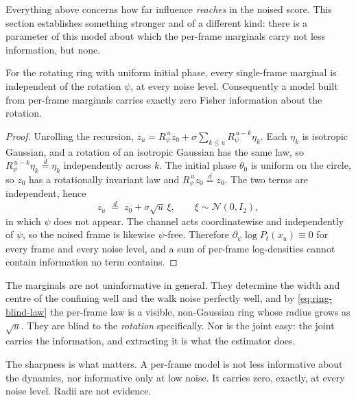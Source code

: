 Everything above concerns how far influence \emph{reaches} in the noised score.
This section establishes something stronger and of a different kind: there is a
parameter of this model about which the per-frame marginals carry not less
information, but none.

\begin{theorem}\label{thm:ring-blindness}
For the rotating ring with uniform initial phase, every single-frame marginal
is independent of the rotation $\psi$, at every noise level. Consequently a
model built from per-frame marginals carries exactly zero Fisher information
about the rotation.
\end{theorem}

\begin{proof}
Unrolling the recursion,
$z_u = R_\psi^{\,u} z_0 + \sigma\sum_{k\le u} R_\psi^{\,u-k}\eta_k$. Each
$\eta_k$ is isotropic Gaussian, and a rotation of an isotropic Gaussian has the
same law, so $R_\psi^{\,u-k}\eta_k \stackrel{d}{=} \eta_k$ independently across $k$. The
initial phase $\theta_0$ is uniform on the circle, so $z_0$ has a rotationally
invariant law and $R_\psi^{\,u} z_0 \stackrel{d}{=} z_0$. The two terms are independent,
hence
\begin{equation}
  z_u \;\stackrel{d}{=}\; z_0 + \sigma\sqrt{u}\,\xi,
  \qquad \xi \sim \mathcal{N}(0, I_2),
  \label{eq:ring-blind-law}
\end{equation}
in which $\psi$ does not appear. The channel acts coordinatewise and
independently of $\psi$, so the noised frame is likewise $\psi$-free. Therefore
$\partial_\psi \log P_t(x_u) \equiv 0$ for every frame and every noise level,
and a sum of per-frame log-densities cannot contain information no term
contains.
\end{proof}

\begin{remark}
The marginals are not uninformative in general. They determine the width and
centre of the confining well and the walk noise perfectly well, and by
\eqref{eq:ring-blind-law} the per-frame law is a visible, non-Gaussian ring
whose radius grows as $\sqrt{u}$. They are blind to the \emph{rotation}
specifically. Nor is the joint easy: the joint carries the information, and
extracting it is what the estimator does.

The sharpness is what matters. A per-frame model is not less informative about
the dynamics, nor informative only at low noise. It carries zero, exactly, at
every noise level. Radii are not evidence.
\end{remark}

